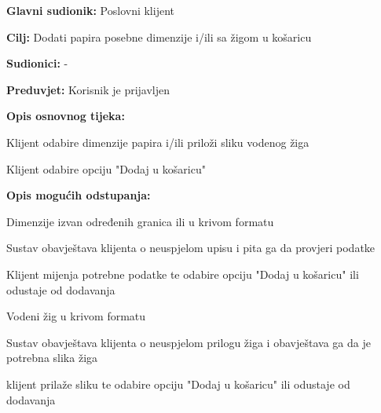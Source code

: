 					\noindent {}
					\begin{packed_item}
						
						\item \textbf{Glavni sudionik: } Poslovni klijent
						\item  \textbf{Cilj:} Dodati papira posebne dimenzije i/ili sa žigom u košaricu
						\item  \textbf{Sudionici:} -
						\item  \textbf{Preduvjet:} Korisnik je prijavljen
						\item  \textbf{Opis osnovnog tijeka:}
						
						\item[] \begin{packed_enum}
							
							\item Klijent odabire dimenzije papira i/ili priloži sliku vodenog žiga
							\item Klijent odabire opciju "Dodaj u košaricu"
						\end{packed_enum}
						
						\item  \textbf{Opis mogućih odstupanja:}
						
						\item[] \begin{packed_item}
							
							\item[2.a]  Dimenzije izvan određenih granica ili u krivom formatu
							\item[] \begin{packed_enum}
								
								\item Sustav obavještava klijenta o neuspjelom upisu i pita ga da provjeri podatke
								\item  Klijent mijenja potrebne podatke te odabire opciju "Dodaj u košaricu" ili odustaje od dodavanja
								
							\end{packed_enum}
						
							\item[2.b]  Vodeni žig u krivom formatu
							\item[] \begin{packed_enum}
								\item Sustav obavještava klijenta o neuspjelom prilogu žiga i obavještava ga da je potrebna slika žiga
								\item klijent prilaže sliku te odabire opciju "Dodaj u košaricu" ili odustaje od dodavanja
						\end{packed_enum}
					\end{packed_item}
				\end{packed_item}
				
